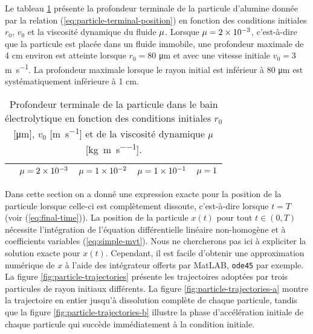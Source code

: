 Le tableau \ref{tab:fall-results} présente la profondeur terminale de
la particule d'alumine donnée par la relation
(\ref{eq:particle-terminal-position}) en fonction des conditions
initiales $r_0$, $v_0$ et la viscosité dynamique du fluide
$\mu$. Lorsque $\mu = \num{2e-3}$,
c'est-à-dire que la particule est placée dans un fluide immobile, une
profondeur maximale de \num{4} \si{\centi\meter} environ est atteinte
lorsque $r_0 = \num{80}$ \si{\micro\meter} et avec une vitesse
initiale $v_0 = \num{3}$ \si{\meter\per\second}. La profondeur
maximale lorsque le rayon initial est inférieur à \num{80}
\si{\micro\meter} est systématiquement inférieure à \num{1}
\si{\centi\meter}.

\begin{table}
  \begin{center}
    \caption{Profondeur terminale de la particule dans le bain
      électrolytique en fonction des conditions initiales $r_0$
      [\si{\micro\meter}], $v_0$ [\si{\meter\per\second}] et de la
      viscosité dynamique $\mu$
      [\si{\kilo\gram\per\meter\per\second}].}
    \label{tab:fall-results}
    \begin{tabularx}{\textwidth}{@{}lXXXX@{}}
      \toprule
      & $\mu = \num{2e-3}$ & $\mu = \num{1e-2}$ & $\mu = \num{1e-1}$ & $\mu = \num{1}$ \\
      \midrule
      
      \bottomrule
    \end{tabularx}
  \end{center}
\end{table}

Dans cette section on a donné une expression exacte pour la position
de la particule lorsque celle-ci est complètement dissoute,
c'est-à-dire lorsque $t = T$ (voir (\ref{eq:final-time})). La position
de la particule $x(t)$ pour tout $t \in(0, T)$ nécessite l'intégration
de l'équation différentielle linéaire non-homogène et à coefficients
variables (\ref{eq:simple-mvt}). Nous ne chercherons pas ici à
expliciter la solution exacte pour $x(t)$. Cependant, il est facile
d'obtenir une approximation numérique de $x$ à l'aide des intégrateur
offerts par MatLAB\textregistered, \texttt{ode45} par exemple. La
figure \ref{fig:particle-trajectories} présente les trajectoires
adoptées par trois particules de rayon initiaux différents. La figure
\ref{fig:particle-trajectories-a} montre la trajectoire en entier
jusqu'à dissolution complète de chaque particule, tandis que la figure
\ref{fig:particle-trajectories-b} illustre la phase d'accélération
initiale de chaque particule qui succède immédiatement à la condition
initiale.

